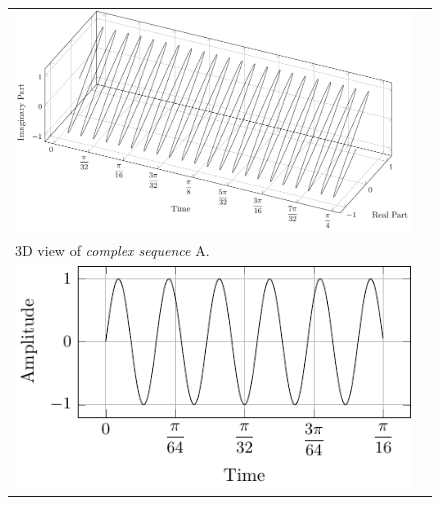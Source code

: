 \documentclass[../../course]{subfiles}
\begin{document}
\begin{figure} [H]

    \renewcommand{\arraystretch}{0.75}
    \centering
    \begin{NiceTabularX} {\textwidth} {
            *{2}{>{\centering\arraybackslash}X}
        }

         {
             {
                \includegraphics[height = \textheight] {tikzpics/plotComplexA.pdf}
            }
        }

        &
        \\

         {
            \vbox{
                 {3D view of \emph{complex sequence} A.}
                \label{plt:cmplxA}
            }
        }

        &
        \\

         {
             {
                \includegraphics[height = \textheight] {tikzpics/plotShortX1.pdf}
            }
        }

        &


\end{NiceTabularX}
\end{figure}
\end{document}
